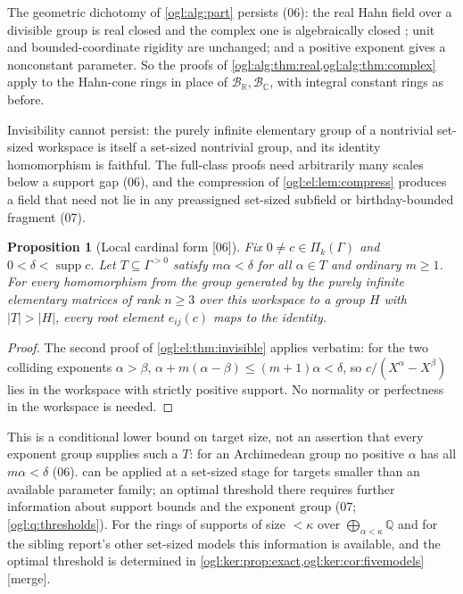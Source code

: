 \documentclass[11pt,oneside]{article}
\numberwithin{equation}{section}
\newtheorem{proposition}[proposition]{Proposition}
\theoremstyle{definition}
\theoremstyle{remark}
\newcommand{\Q}{\mathbb Q}
\newcommand{\R}{\mathbb R}
\newcommand{\C}{\mathbb C}
\newcommand{\BR}{\mathcal B_{\R}}
\newcommand{\BC}{\mathcal B_{\C}}
\newcommand{\supp}{\operatorname{supp}}
\newcommand{\src}[1]{\textup{\textsf{\small[#1]}}}
\newcommand{\mergetag}{\textup{\textsf{\small[merge]}}}
\begin{document}
The geometric dichotomy of \cref{ogl:alg:part} persists (06): the real Hahn
field over a divisible group is real closed and the complex one is
algebraically closed \cite[Corollary~4]{Poonen}; unit and bounded-coordinate
rigidity are unchanged; and a positive exponent gives a nonconstant parameter.
So the proofs of \cref{ogl:alg:thm:real,ogl:alg:thm:complex} apply to the
Hahn-cone rings in place of $\BR,\BC$, with integral constant rings as before.

Invisibility cannot persist: the purely infinite elementary group of a
nontrivial set-sized workspace is itself a set-sized nontrivial group, and its
identity homomorphism is faithful. The full-class proofs need arbitrarily many
scales below a support gap (06), and the compression of
\cref{ogl:el:lem:compress} produces a field that need not lie in any
preassigned set-sized subfield or birthday-bounded fragment (07).

\begin{proposition}[Local cardinal form \src{06}]\label{ogl:el:prop:local}
Fix $0\ne c\in\Pi_k(\Gamma)$ and $0<\delta<\supp c$. Let $T\subseteq\Gamma^{>0}$
satisfy $m\alpha<\delta$ for all $\alpha\in T$ and ordinary $m\ge1$. For every
homomorphism from the group generated by the purely infinite elementary
matrices of rank $n\ge3$ over this workspace to a group $H$ with $|T|>|H|$,
every root element $e_{ij}(c)$ maps to the identity.
\end{proposition}
\begin{proof}
The second proof of \cref{ogl:el:thm:invisible} applies verbatim: for the two
colliding exponents $\alpha>\beta$, $\alpha+m(\alpha-\beta)\le(m+1)\alpha<\delta$,
so $c/(X^\alpha-X^\beta)$ lies in the workspace with strictly positive
support. No normality or perfectness in the workspace is needed.
\end{proof}

This is a conditional lower bound on target size, not an assertion that every
exponent group supplies such a $T$: for an Archimedean group no positive
$\alpha$ has all $m\alpha<\delta$ (06).  can be
applied at a set-sized stage for targets smaller than an available parameter
family; an optimal threshold there requires further information about support
bounds and the exponent group (07; \cref{ogl:q:thresholds}). For the rings of
supports of size $<\kappa$ over $\bigoplus_{\alpha<\kappa}\Q$ and for the
sibling report's other set-sized models this information is available, and the
optimal threshold is determined in
\cref{ogl:ker:prop:exact,ogl:ker:cor:fivemodels} \mergetag.
\end{document}
